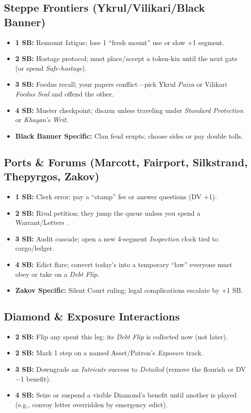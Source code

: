 \subsection{Steppe Frontiers (Ykrul/Vilikari/Black Banner)}
\begin{itemize}
  \item \textbf{1 SB:} Remount fatigue; lose 1 ``fresh mount'' use or slow +1 segment.
  \item \textbf{2 SB:} Hostage protocol; must place/accept a token-kin until the next gate (or spend \emph{Safe-hostage}).
  \item \textbf{3 SB:} Foedus recall; your papers conflict---pick Ykrul \emph{Paiza} or Vilikari \emph{Foedus Seal} and offend the other.
  \item \textbf{4 SB:} Muster checkpoint; disarm unless traveling under \emph{Standard Protection} or \emph{Khagan's Writ}.
  \item \textbf{Black Banner Specific:} Clan feud erupts; choose sides or pay double tolls.
\end{itemize}

\subsection{Ports \& Forums (Marcott, Fairport, Silkstrand, Thepyrgos, Zakov)}
\begin{itemize}
  \item \textbf{1 SB:} Clerk error; pay a ``stamp'' fee or answer questions (DV +1).
  \item \textbf{2 SB:} Rival petition; they jump the queue unless you spend a Warrant/Letters \SuitDiamond{}.
  \item \textbf{3 SB:} Audit cascade; open a new 4-segment \emph{Inspection} clock tied to cargo/ledger.
  \item \textbf{4 SB:} Edict flare; convert today's \SuitClub{} into a temporary ``law'' everyone must obey or take on a \emph{Debt Flip}.
  \item \textbf{Zakov Specific:} Silent Court ruling; legal complications escalate by +1 SB.
\end{itemize}

\subsection{Diamond \& Exposure Interactions}
\begin{itemize}
  \item \textbf{2 SB:} Flip any \SuitDiamond{} spent this leg: its \emph{Debt Flip} is collected now (not later).
  \item \textbf{2 SB:} Mark 1 step on a named Asset/Patron's \emph{Exposure} track.
  \item \textbf{3 SB:} Downgrade an \emph{Intricate} success to \emph{Detailed} (remove the flourish or DV −1 benefit).
  \item \textbf{4 SB:} Seize or suspend a visible Diamond's benefit until another is played (e.g., convoy letter overridden by emergency edict).
\end{itemize}

